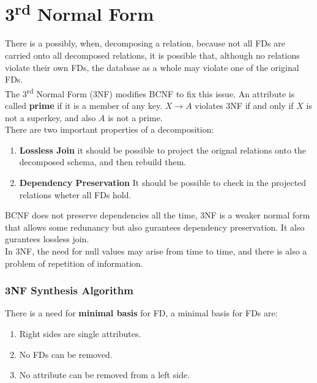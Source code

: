 \documentclass[11pt,a4paper,twocolumn]{book}
\begin{document}
\section{3\textsuperscript{rd} Normal Form}

There is a possibly, when, decomposing a relation, because not all FDs are carried onto all decomposed relations, it is possible that, although no relations violate their own FDs, the database as a whole may violate one of the original FDs.\\

The 3\textsuperscript{rd} Normal Form (3NF) modifies BCNF to fix this issue. An attribute is called \textbf{prime} if it is a member of any key. $X \to A$ violates 3NF if and only if $X$ is not a superkey, and also $A$ is not a prime.\\

There are two important properties of a decomposition:

\begin{enumerate}
\item \textbf{Lossless Join} it should be possible to project the orignal relations onto the decomposed schema, and then rebuild them.
\item \textbf{Dependency Preservation} It should be possible to check in the projected relations wheter all FDs hold.
\end{enumerate}

BCNF does not preserve dependencies all the time, 3NF is a weaker normal form that allows some redunancy but also gurantees dependency preservation. It also gurantees lossless join.\\

In 3NF, the need for null values may arise from time to time, and there is also a problem of repetition of information.

\subsubsection{3NF Synthesis Algorithm}

There is a need for \textbf{minimal basis} for FD, a minimal basis  for FDs are:

\begin{enumerate}
\item Right sides are single attributes.
\item No FDs can be removed.
\item No attribute can be removed from a left side.
\end{enumerate}
\end{document}
